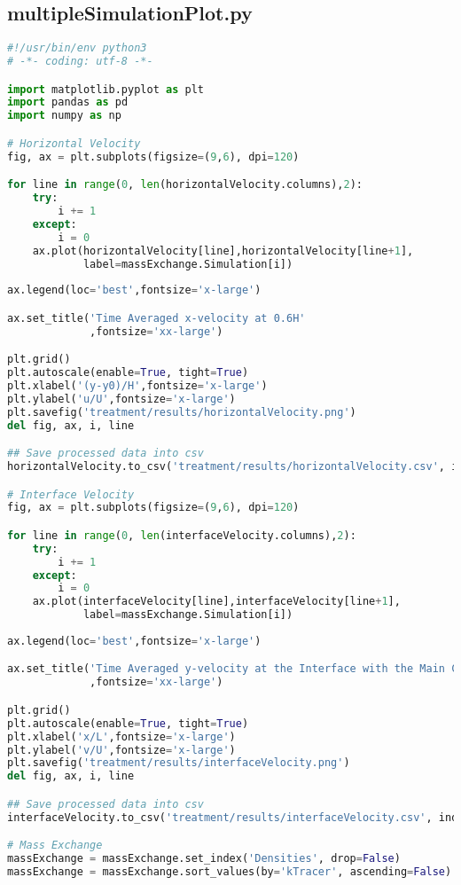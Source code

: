 \documentclass[../main.tex]{subfiles}
\begin{document}
\subsection{multipleSimulationPlot.py}
\begin{lstlisting}[language=python]
#!/usr/bin/env python3
# -*- coding: utf-8 -*-

import matplotlib.pyplot as plt
import pandas as pd
import numpy as np

# Horizontal Velocity
fig, ax = plt.subplots(figsize=(9,6), dpi=120)

for line in range(0, len(horizontalVelocity.columns),2):
    try:
        i += 1
    except:
        i = 0
    ax.plot(horizontalVelocity[line],horizontalVelocity[line+1],
            label=massExchange.Simulation[i])
    
ax.legend(loc='best',fontsize='x-large')

ax.set_title('Time Averaged x-velocity at 0.6H'
             ,fontsize='xx-large')

plt.grid()
plt.autoscale(enable=True, tight=True)
plt.xlabel('(y-y0)/H',fontsize='x-large')
plt.ylabel('u/U',fontsize='x-large')
plt.savefig('treatment/results/horizontalVelocity.png')
del fig, ax, i, line

## Save processed data into csv
horizontalVelocity.to_csv('treatment/results/horizontalVelocity.csv', index=False)

# Interface Velocity
fig, ax = plt.subplots(figsize=(9,6), dpi=120)

for line in range(0, len(interfaceVelocity.columns),2):
    try:
        i += 1
    except:
        i = 0
    ax.plot(interfaceVelocity[line],interfaceVelocity[line+1],
            label=massExchange.Simulation[i])
    
ax.legend(loc='best',fontsize='x-large')

ax.set_title('Time Averaged y-velocity at the Interface with the Main Channel'
             ,fontsize='xx-large')

plt.grid()
plt.autoscale(enable=True, tight=True)
plt.xlabel('x/L',fontsize='x-large')
plt.ylabel('v/U',fontsize='x-large')
plt.savefig('treatment/results/interfaceVelocity.png')
del fig, ax, i, line

## Save processed data into csv
interfaceVelocity.to_csv('treatment/results/interfaceVelocity.csv', index=False)

# Mass Exchange
massExchange = massExchange.set_index('Densities', drop=False)
massExchange = massExchange.sort_values(by='kTracer', ascending=False)


\end{lstlisting}
\end{document}
